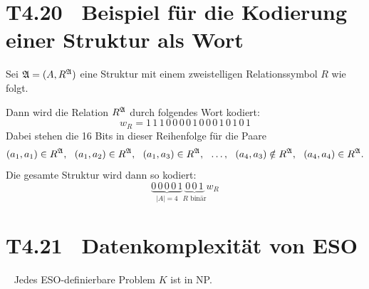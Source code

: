 \documentclass[fontsize=11pt, twoside=false, numbers=autoenddot]{scrbook}
\begin{document}
\section*{T4.20~ Beispiel für die Kodierung einer Struktur als Wort}

Sei $\mathfrak{A} = (A,R^\mathfrak{A})$ eine Struktur mit einem zweistelligen
Relationssymbol $R$ wie folgt.
%
\begin{center}
\end{center}
%
Dann wird die Relation $R^\mathfrak{A}$ durch folgendes Wort kodiert:
\[
  w_R = 1\,1\,1\,0\,0\,0\,0\,1\,0\,0\,0\,1\,0\,1\,0\,1
\]
Dabei stehen die 16 Bits in dieser Reihenfolge für die Paare
\[
  (a_1,a_1) \in R^\mathfrak{A},~~
  (a_1,a_2) \in R^\mathfrak{A},~~
  (a_1,a_3) \in R^\mathfrak{A},~~
  \dots,~~
  (a_4,a_3) \notin R^\mathfrak{A},~~
  (a_4,a_4) \in R^\mathfrak{A}.
\]
Die gesamte Struktur wird dann so kodiert:
\[
  \underbrace{0\,0\,0\,0\,1}_{|A|=4}\!
  \underbrace{0\,0\,1}_{R \text{~binär}}\!\!
  w_R
\]

\pagebreak
\section*{T4.21~ Datenkomplexität von ESO}

~
Jedes ESO-definierbare Problem $K$ ist in NP.
\end{document}
